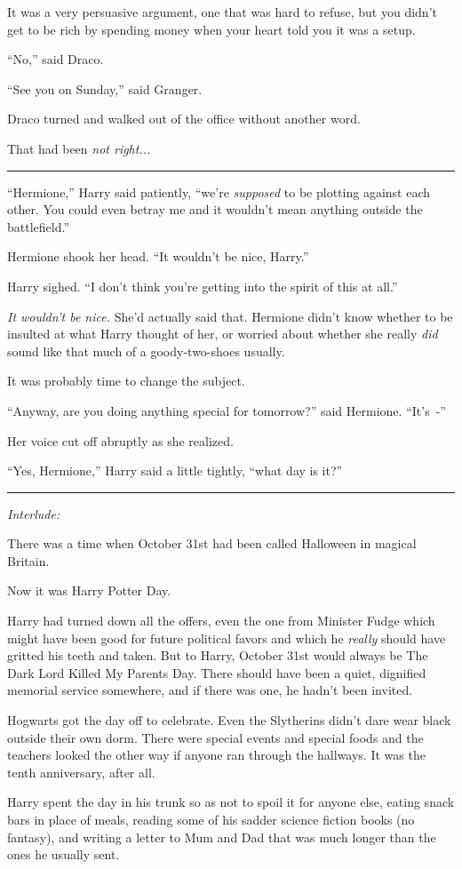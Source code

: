 It was a very persuasive argument, one that was hard to refuse, but you didn't get to be rich by spending money when your heart told you it was a setup.

``No,'' said Draco.

``See you on Sunday,'' said Granger.

Draco turned and walked out of the office without another word.

That had been \emph{not right...}

\begin{center}\rule{3in}{0.4pt}\end{center}

``Hermione,'' Harry said patiently, ``we're \emph{supposed} to be plotting against each other. You could even betray me and it wouldn't mean anything outside the battlefield.''

Hermione shook her head. ``It wouldn't be nice, Harry.''

Harry sighed. ``I don't think you're getting into the spirit of this at all.''

\emph{It wouldn't be nice.} She'd actually said that. Hermione didn't know whether to be insulted at what Harry thought of her, or worried about whether she really \emph{did} sound like that much of a goody-two-shoes usually.

It was probably time to change the subject.

``Anyway, are you doing anything special for tomorrow?'' said Hermione. ``It's~-''

Her voice cut off abruptly as she realized.

``Yes, Hermione,'' Harry said a little tightly, ``what day is it?''

\begin{center}\rule{3in}{0.4pt}\end{center}

\emph{Interlude:}

There was a time when October 31st had been called Halloween in magical Britain.

Now it was Harry Potter Day.

Harry had turned down all the offers, even the one from Minister Fudge which might have been good for future political favors and which he \emph{really} should have gritted his teeth and taken. But to Harry, October 31st would always be The Dark Lord Killed My Parents Day. There should have been a quiet, dignified memorial service somewhere, and if there was one, he hadn't been invited.

Hogwarts got the day off to celebrate. Even the Slytherins didn't dare wear black outside their own dorm. There were special events and special foods and the teachers looked the other way if anyone ran through the hallways. It was the tenth anniversary, after all.

Harry spent the day in his trunk so as not to spoil it for anyone else, eating snack bars in place of meals, reading some of his sadder science fiction books (no fantasy), and writing a letter to Mum and Dad that was much longer than the ones he usually sent.
